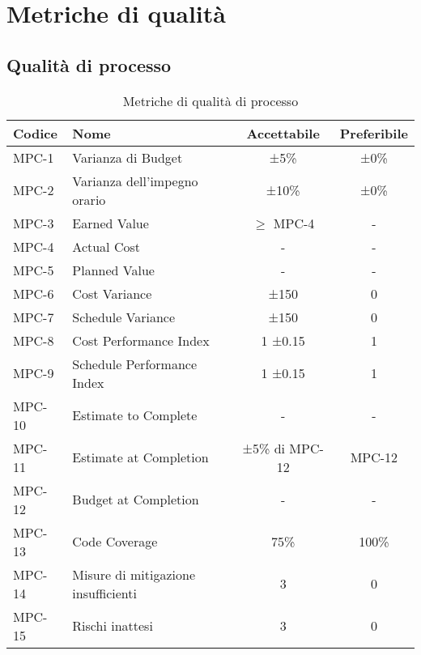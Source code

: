 
\section{Metriche di qualità}
\label{sec:metriche di qualità}

\subsection{Qualità di processo}
\label{sec:Qualità di processo}
\begin{table}[h!]
    \centering
    \renewcommand{\arraystretch}{1.5}
    \setlength{\tabcolsep}{5pt}
    \begin{tabularx}{\textwidth}{|l|X|c|c|}
    \hline
    \rowcolor[HTML]{FFD700}
    \textbf{Codice} & \textbf{Nome} & \textbf{Accettabile} & \textbf{Preferibile} \\ \hline
    MPC-1 & Varianza di Budget & ±5\% & ±0\% \\ \hline
    MPC-2 & Varianza dell’impegno orario & ±10\% & ±0\% \\ \hline
    MPC-3 & Earned Value & \(\geq\) MPC-4 & - \\ \hline
    MPC-4 & Actual Cost & - & - \\ \hline
    MPC-5 & Planned Value & - & - \\ \hline
    MPC-6 & Cost Variance & ±150 & 0 \\ \hline
    MPC-7 & Schedule Variance & ±150 & 0 \\ \hline
    MPC-8 & Cost Performance Index & 1 ±0.15 & 1 \\ \hline
    MPC-9 & Schedule Performance Index & 1 ±0.15 & 1 \\ \hline
    MPC-10 & Estimate to Complete & - & - \\ \hline
    MPC-11 & Estimate at Completion & ±5\% di MPC-12 & MPC-12 \\ \hline
    MPC-12 & Budget at Completion & - & - \\ \hline
    MPC-13 & Code Coverage & 75\% & 100\% \\ \hline
    MPC-14 & Misure di mitigazione insufficienti & 3 & 0 \\ \hline
    MPC-15 & Rischi inattesi & 3 & 0 \\ \hline
    \end{tabularx}
    \caption{Metriche di qualità di processo}
    \label{tab:metriche-qualita-processo}
\end{table}



